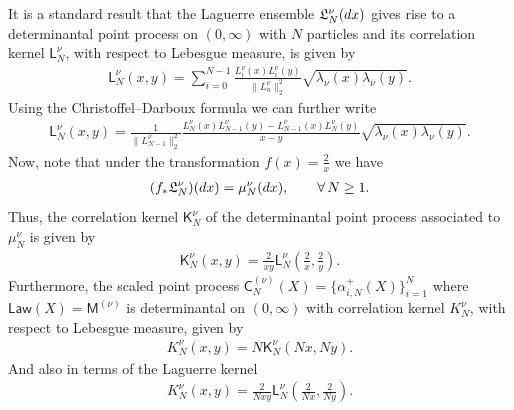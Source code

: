 \documentclass[11pt]{article}
\numberwithin{equation}{section}
\begin{document}
It is a standard result that the Laguerre ensemble $\mathfrak{L}_N^{\nu}({\rm d}x)$ gives rise to a determinantal point process on $(0,\infty)$ with $N$ particles and its correlation kernel $\mathsf{L}_{N}^{\nu}$, with respect to Lebesgue measure, is given by
\begin{gather*}
\mathsf{L}_{N}^{\nu}(x,y)=\sum_{i=0}^{N-1}\frac{L_i^{\nu}(x)L_i^{\nu}(y)}{\|L_n^{\nu}\|_2^2}\sqrt{\lambda_\nu(x)\lambda_\nu(y)}.
\end{gather*}
Using the Christoffel--Darboux formula we can further write
\begin{gather*}
\mathsf{L}_{N}^{\nu}(x,y)=\frac{1}{\|L_{N-1}^{\nu}\|_2^2}\frac{L_{N}^{\nu}(x)L_{N-1}^{\nu}(y)-L_{N-1}^{\nu}(x)L_{N}^{\nu}(y)}{x-y}\sqrt{\lambda_\nu(x)\lambda_\nu(y)}.
\end{gather*}
Now, note that under the transformation $f(x)=\frac{2}{x}$ we have
\begin{gather*}
(f_*\mathfrak{L}_N^{\nu})({\rm d}x)=\mu_N^{\nu}({\rm d}x), \qquad \forall\, N \ge 1.
\end{gather*}
Thus, the correlation kernel $\mathsf{K}_N^{\nu}$ of the determinantal point process associated to $\mu_N^{\nu}$ is given by
\begin{gather*}
\mathsf{K}_N^{\nu}(x,y)=\frac{2}{xy}\mathsf{L}_N^{\nu}\left(\frac{2}{x},\frac{2}{y}\right).
\end{gather*}
Furthermore, the scaled point process $\mathsf{C}_N^{(\nu)}(X)=\{\alpha_{i,N}^+(X) \}_{i=1}^N$ where $\mathsf{Law}(X)=\mathsf{M}^{(\nu)}$ is deter\-minantal on $(0,\infty)$ with correlation kernel $K_N^{\nu}$, with respect to Lebesgue measure, given by
\begin{gather*}
K_N^{\nu}(x,y)=N\mathsf{K}_N^{\nu}(Nx,Ny).
\end{gather*}
And also in terms of the Laguerre kernel
\begin{gather}\label{KernelRelation}
K_N^{\nu}(x,y)=\frac{2}{Nxy}\mathsf{L}_N^{\nu}\left(\frac{2}{Nx},\frac{2}{Ny}\right).
\end{gather}
\end{document}
